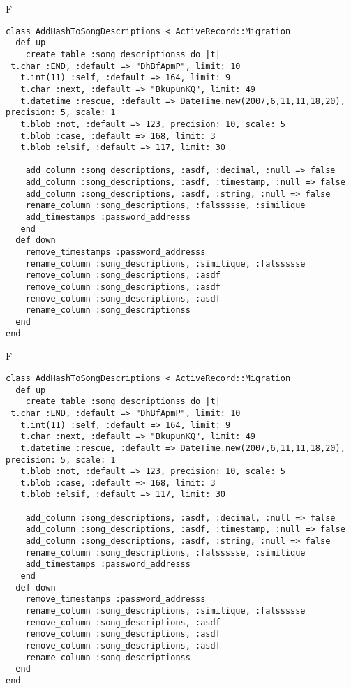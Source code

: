 F
\begin{verbatim}
class AddHashToSongDescriptions < ActiveRecord::Migration
  def up
    create_table :song_descriptionss do |t| 
 t.char :END, :default => "DhBfApmP", limit: 10
   t.int(11) :self, :default => 164, limit: 9
   t.char :next, :default => "BkupunKQ", limit: 49
   t.datetime :rescue, :default => DateTime.new(2007,6,11,11,18,20), precision: 5, scale: 1
   t.blob :not, :default => 123, precision: 10, scale: 5
   t.blob :case, :default => 168, limit: 3
   t.blob :elsif, :default => 117, limit: 30

    add_column :song_descriptions, :asdf, :decimal, :null => false
    add_column :song_descriptions, :asdf, :timestamp, :null => false
    add_column :song_descriptions, :asdf, :string, :null => false
    rename_column :song_descriptions, :falssssse, :similique
    add_timestamps :password_addresss
   end
  def down
    remove_timestamps :password_addresss
    rename_column :song_descriptions, :similique, :falssssse
    remove_column :song_descriptions, :asdf
    remove_column :song_descriptions, :asdf
    remove_column :song_descriptions, :asdf
    rename_column :song_descriptionss
  end
end
\end{verbatim}

F
\begin{verbatim}
class AddHashToSongDescriptions < ActiveRecord::Migration
  def up
    create_table :song_descriptionss do |t| 
 t.char :END, :default => "DhBfApmP", limit: 10
   t.int(11) :self, :default => 164, limit: 9
   t.char :next, :default => "BkupunKQ", limit: 49
   t.datetime :rescue, :default => DateTime.new(2007,6,11,11,18,20), precision: 5, scale: 1
   t.blob :not, :default => 123, precision: 10, scale: 5
   t.blob :case, :default => 168, limit: 3
   t.blob :elsif, :default => 117, limit: 30

    add_column :song_descriptions, :asdf, :decimal, :null => false
    add_column :song_descriptions, :asdf, :timestamp, :null => false
    add_column :song_descriptions, :asdf, :string, :null => false
    rename_column :song_descriptions, :falssssse, :similique
    add_timestamps :password_addresss
   end
  def down
    remove_timestamps :password_addresss
    rename_column :song_descriptions, :similique, :falssssse
    remove_column :song_descriptions, :asdf
    remove_column :song_descriptions, :asdf
    remove_column :song_descriptions, :asdf
    rename_column :song_descriptionss
  end
end
\end{verbatim}

